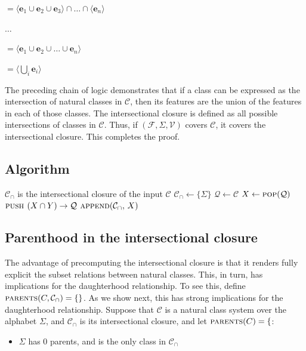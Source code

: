 \documentclass[11pt, oneside]{article}   	%
\begin{document}
\quad $ = \langle \mathbf{e}_1 \cup \mathbf{e}_2 \cup \mathbf{e}_3 \rangle \cap \ldots \cap \langle \mathbf{e}_n \rangle$

\quad $\ldots$

\quad $= \langle \mathbf{e}_1 \cup \mathbf{e}_2 \cup \ldots \cup \mathbf{e}_n \rangle$

\quad $= \langle \bigcup_i  \mathbf{e}_i \rangle$

\noindent The preceding chain of logic demonstrates that if a class can be expressed as the intersection of natural classes in $\mathcal C$, then its features are the union of the features in each of those classes. The intersectional closure is defined as all possible intersections of classes in $\mathcal C$. Thus, if $(\mathcal F, \Sigma, \mathcal V)$ covers $\mathcal C$, it covers the intersectional closure. This completes the proof.

\subsection{Algorithm}

\noindent \begin{algorithmic}
    \ENSURE $\mathcal C_\cap$ is the intersectional closure of the input $\mathcal C$
    \STATE
    \STATE $\mathcal C_\cap \leftarrow \{ \Sigma \} $
    \STATE $\mathcal Q \leftarrow \mathcal C$
    \STATE
        \STATE $X \leftarrow \textsc{pop}(\mathcal Q)$
                \STATE $\textsc{push } (X \cap Y) \rightarrow \mathcal Q$
            \ENDFOR
            \STATE $\textsc{append}(\mathcal C_\cap, \, X)$
        \ENDIF
    \ENDWHILE
\end{algorithmic}

\subsection{Parenthood in the intersectional closure}







\vspace{\baselineskip} The advantage of precomputing the intersectional closure is that it renders fully explicit the subset relations between natural classes. This, in turn, has implications for the daughterhood relationship. To see this, define $\textsc{parents}(C, \mathcal C_\cap) = \{ \} $. As we show next, this has strong implications for the daughterhood relationship. Suppose that $\mathcal C$ is a natural class system over the alphabet $\Sigma$, and $\mathcal C_\cap$ is its intersectional closure, and let $\textsc{parents}(C) = \{ $: \begin{itemize}
    \item $\Sigma$ has 0 parents, and is the only class in $\mathcal C_\cap$
    \end{itemize}
\end{document}

